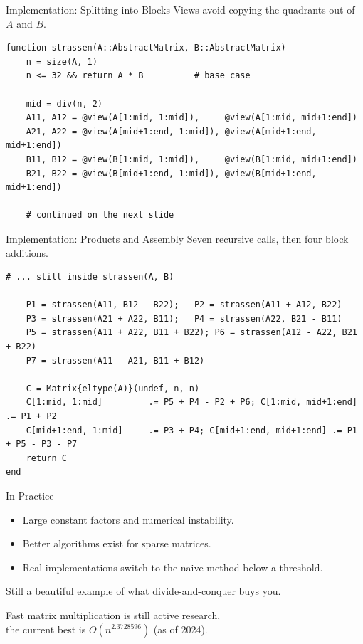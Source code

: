 \documentclass[10pt,aspectratio=169]{beamer}
\begin{document}
\begin{frame}[fragile]{Implementation: Splitting into Blocks}
  Views avoid copying the quadrants out of $A$ and $B$.

  \begin{lstlisting}[basicstyle=\ttfamily\small]
function strassen(A::AbstractMatrix, B::AbstractMatrix)
    n = size(A, 1)
    n <= 32 && return A * B          # base case

    mid = div(n, 2)
    A11, A12 = @view(A[1:mid, 1:mid]),     @view(A[1:mid, mid+1:end])
    A21, A22 = @view(A[mid+1:end, 1:mid]), @view(A[mid+1:end, mid+1:end])
    B11, B12 = @view(B[1:mid, 1:mid]),     @view(B[1:mid, mid+1:end])
    B21, B22 = @view(B[mid+1:end, 1:mid]), @view(B[mid+1:end, mid+1:end])

    # continued on the next slide
  \end{lstlisting}
\end{frame}

\begin{frame}[fragile]{Implementation: Products and Assembly}
  Seven recursive calls, then four block additions.

  \begin{lstlisting}[basicstyle=\ttfamily\small]
    # ... still inside strassen(A, B)

    P1 = strassen(A11, B12 - B22);   P2 = strassen(A11 + A12, B22)
    P3 = strassen(A21 + A22, B11);   P4 = strassen(A22, B21 - B11)
    P5 = strassen(A11 + A22, B11 + B22); P6 = strassen(A12 - A22, B21 + B22)
    P7 = strassen(A11 - A21, B11 + B12)

    C = Matrix{eltype(A)}(undef, n, n)
    C[1:mid, 1:mid]         .= P5 + P4 - P2 + P6; C[1:mid, mid+1:end]     .= P1 + P2
    C[mid+1:end, 1:mid]     .= P3 + P4; C[mid+1:end, mid+1:end] .= P1 + P5 - P3 - P7
    return C
end
  \end{lstlisting}
\end{frame}

\begin{frame}{In Practice}
  \begin{itemize}
    \item Large constant factors and numerical instability.
    \item Better algorithms exist for sparse matrices.
    \item Real implementations switch to the naive method below a threshold.
  \end{itemize}

  \bigskip
  \begin{center}
    Still a beautiful example of what divide-and-conquer buys you.
  \end{center}

  \bigskip
  \begin{center}
    \small Fast matrix multiplication is still active research,\\
    the current best is $O(n^{2.3728596})$ (as of 2024).
  \end{center}
\end{frame}
\end{document}
